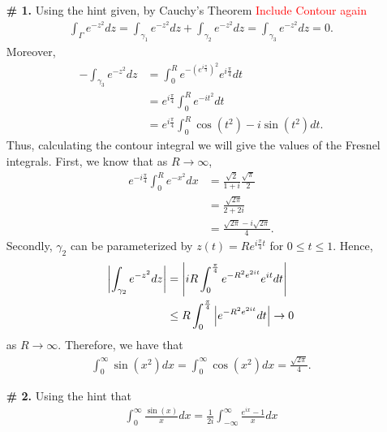 \documentclass[a4paper,12pt]{article} %
\theoremstyle{plain}
\theoremstyle{definition}
\begin{document}
 \begin{enumerate}
   \item[\textbf{\# 1.}]  Using the hint given, by Cauchy's Theorem \textcolor{red}{Include Contour again}
     \begin{align*}
       \int_{\Gamma} e^{-z^2} dz = \int_{\gamma_1} e^{-z^2} dz + \int_{\gamma_2} e^{-z^2}dz = \int_{\gamma_3} e^{-z^2} dz = 0.
     \end{align*}
     Moreover, 
     \begin{align*}
       -\int_{\gamma_3} e^{-z^2} dz &= \int_{0}^{R} e^{-(e^{i \frac{\pi}{4}})^2} e^{i \frac{\pi}{4}} dt \\
                                    &= e^{i\frac{\pi}{4}} \int_{0}^{R} e^{-it^2} dt \\
                                    &= e^{i \frac{\pi}{4}} \int_{0}^{R} \cos(t^2) - i \sin(t^2) dt.
     \end{align*}
     Thus, calculating the contour integral we will give the values of the Fresnel integrals.  First, we know that as $R \to \infty$,
     \begin{align*}
       e^{-i \frac{\pi}{4}}\int_{0}^{R} e^{-x^2} dx &= \frac{\sqrt{2}}{1+i}\frac{\sqrt{\pi} }{2} \\
                                                    &= \frac{\sqrt{2\pi} }{2 + 2i} \\
                                                    &= \frac{\sqrt{2\pi} -i \sqrt{2\pi} }{4}.
     \end{align*}
     Secondly, $\gamma_2$ can be parameterized by $z(t) = Re^{i\frac{\pi}{4}t}$ for $0 \le  t \le 1$.  Hence,
     \begin{align*}
       \abs{\int_{\gamma_2} e^{-z^2}dz} &= \abs{i R \int_{0}^{\frac{\pi}{4}} e^{-R^2e^{2it}} e^{it}dt} \\
                                        &\le R \int_{0}^{\frac{\pi}{4}} \abs{e^{-R^2e^{2it}}dt} \to 0
     \end{align*}
     as $R \to \infty$.  Therefore, we have that
     \begin{align*}
       \int_0^{\infty}\sin(x^2) dx = \int_0^{\infty} \cos(x^2)  dx = \frac{\sqrt{2\pi} }{4}.
     \end{align*}
   \item[\textbf{\# 2.}]  Using the hint that 
     \begin{align*}
       \int_{0}^{\infty} \frac{\sin(x)}{x} dx = \frac{1}{2i} \int_{-\infty}^{\infty}\frac{e^{ix} - 1}{x} dx
     \end{align*}

\end{enumerate}
\end{document}
